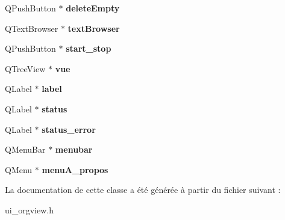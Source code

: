 \begin{DoxyCompactItemize}
\item 
Q\-Push\-Button $\ast$ {\bfseries delete\-Empty}\label{class_ui___org_view_a3ef3f01b2a60312f4cda4cba06c43f23}

\item 
Q\-Text\-Browser $\ast$ {\bfseries text\-Browser}\label{class_ui___org_view_a072c0e185f24999aca89315bce02d85f}

\item 
Q\-Push\-Button $\ast$ {\bfseries start\-\_\-stop}\label{class_ui___org_view_a711bbee29b7c6ebe4e9073a0ed2e7f4a}

\item 
Q\-Tree\-View $\ast$ {\bfseries vue}\label{class_ui___org_view_ad4c16eb931a988940910273ad90ef890}

\item 
Q\-Label $\ast$ {\bfseries label}\label{class_ui___org_view_ae66a8c35e4bae47a02b1f1ca006fd480}

\item 
Q\-Label $\ast$ {\bfseries status}\label{class_ui___org_view_a3d195c0b3eda35223a31c9402dbb46cc}

\item 
Q\-Label $\ast$ {\bfseries status\-\_\-error}\label{class_ui___org_view_a810e8b7a40b0e24884c7e36ec0871497}

\item 
Q\-Menu\-Bar $\ast$ {\bfseries menubar}\label{class_ui___org_view_a25db5f5d75ec4ede06dab4539d532f2e}

\item 
Q\-Menu $\ast$ {\bfseries menu\-A\-\_\-propos}\label{class_ui___org_view_a16b200c0fe2f93152cedf3d1a1a08f2f}

\end{DoxyCompactItemize}


La documentation de cette classe a été générée à partir du fichier suivant \-:\begin{DoxyCompactItemize}
\item 
ui\-\_\-orgview.\-h\end{DoxyCompactItemize}
